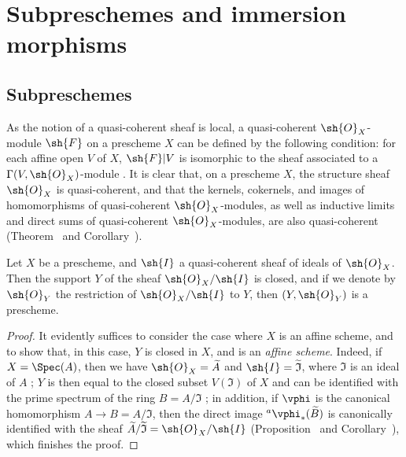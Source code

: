 \section{Subpreschemes and immersion morphisms}
\label{section:I.4}

\subsection{Subpreschemes}
\label{subsection:I.4.1}

\begin{env}[4.1.1]
\label{I.4.1.1}
As the notion of a quasi-coherent sheaf  is local, a quasi-coherent $\sh{O}_X$-module $\sh{F}$ on a prescheme $X$ can be defined by the following condition: for each affine open $V$ of $X$, $\sh{F}|V$ is isomorphic to the sheaf associated to a $\Gamma(V,\sh{O}_X)$-module .
It is clear that, on a prescheme $X$, the structure sheaf $\sh{O}_X$ is quasi-coherent, and that the kernels, cokernels, and images of homomorphisms of quasi-coherent $\sh{O}_X$-modules, as well as inductive limits and direct sums of quasi-coherent $\sh{O}_X$-modules, are also quasi-coherent (Theorem~ and Corollary~).
\end{env}

\begin{proposition}[4.1.2]
\label{I.4.1.2}
Let $X$ be a prescheme, and $\sh{I}$ a quasi-coherent sheaf of ideals of $\sh{O}_X$.
Then the support $Y$ of the sheaf $\sh{O}_X/\sh{I}$ is closed, and if we denote by $\sh{O}_Y$ the restriction of $\sh{O}_X/\sh{I}$ to $Y$, then $(Y,\sh{O}_Y)$ is a prescheme.
\end{proposition}

\begin{proof}
It evidently suffices  to consider the case where $X$ is an affine scheme, and to show that, in this case, $Y$ is closed in $X$, and is an \emph{affine scheme}.
Indeed, if $X=\Spec(A)$, then we have $\sh{O}_X=\widetilde{A}$ and $\sh{I}=\widetilde{\mathfrak{I}}$, where $\mathfrak{I}$ is an ideal of $A$ ;
$Y$ is then equal to the closed subset $V(\mathfrak{I})$ of $X$ and can be identified with the prime spectrum of the ring $B=A/\mathfrak{I}$ ;
in addition, if $\vphi$ is the canonical homomorphism $A\to B=A/\mathfrak{I}$, then the direct image ${}^a\vphi_*(\widetilde{B})$ is canonically identified with the sheaf $\widetilde{A}/\widetilde{\mathfrak{I}}=\sh{O}_X/\sh{I}$ (Proposition~ and Corollary~), which finishes the proof.
\end{proof}

